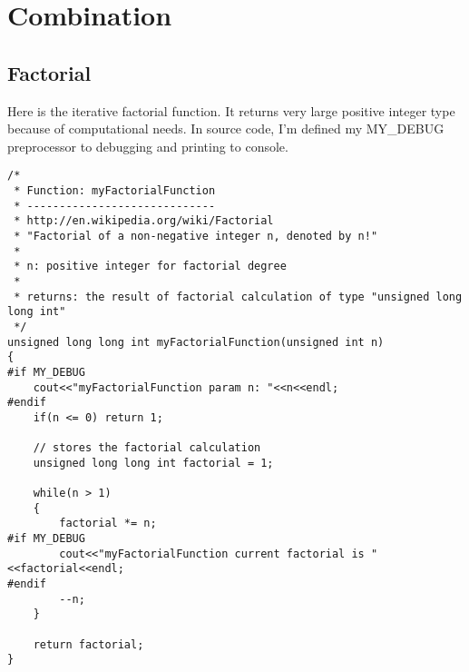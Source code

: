 \documentclass{article}
\begin{document}
\section{Combination}

	\subsection{Factorial}
	Here is the iterative factorial function. It returns very large positive integer type because of computational needs. In source code, I'm defined my MY\_DEBUG preprocessor to debugging and printing to console.
	
		\begin{lstlisting}[label=factorial-function,caption=Factorial]	
/*
 * Function: myFactorialFunction
 * -----------------------------
 * http://en.wikipedia.org/wiki/Factorial
 * "Factorial of a non-negative integer n, denoted by n!"
 *
 * n: positive integer for factorial degree
 *
 * returns: the result of factorial calculation of type "unsigned long long int"
 */
unsigned long long int myFactorialFunction(unsigned int n)
{
#if MY_DEBUG
    cout<<"myFactorialFunction param n: "<<n<<endl;
#endif
    if(n <= 0) return 1;
    
    // stores the factorial calculation
    unsigned long long int factorial = 1;
    
    while(n > 1)
    {
        factorial *= n;
#if MY_DEBUG
        cout<<"myFactorialFunction current factorial is "<<factorial<<endl;
#endif
        --n;
    }
    
    return factorial;
}
		\end{lstlisting}
\end{document}
